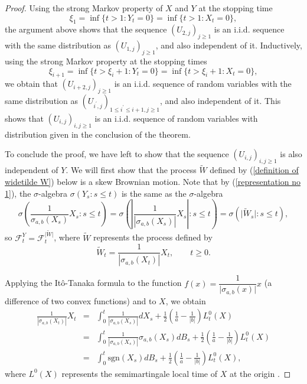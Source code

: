 \documentclass[reqno]{amsart}
\theoremstyle{definition}
\theoremstyle{remark}
\numberwithin{equation}{section}
\begin{document}
\begin{proof}
Using the strong Markov property of $X$ and $Y$ at the stopping time $$\xi_1=\inf\{t>1: Y_t=0\}=\inf\{t>1:X_t=0\},$$ the argument above shows that the sequence $(U_{2,j})_{j\geq1}$ is an i.i.d. sequence with the same distribution as $(U_{1,j})_{j\geq1}$, and also independent of it. Inductively, using the strong Markov property at the stopping times $$\xi_{i+1}=\inf\{t>\xi_i+1: Y_t=0\}=\inf\{t>\xi_i+1:X_t=0\},$$ we obtain that $(U_{i+2,j})_{j\geq1}$ is an i.i.d. sequence of random variables with the same distribution as $(U_{i^\prime,j})_{1\leq i^\prime \leq i+1, j\geq 1}$, and also independent of it. This shows that $(U_{i,j})_{i,j\geq1}$ is an i.i.d. sequence of random variables with distribution given in the conclusion of the theorem.

To conclude the proof, we have left to show that the sequence $(U_{i,j})_{i,j\ge 1}$ is also independent of $Y$. We will first show that the process $\widetilde{W}$ defined by (\ref{definition of widetilde W}) below is a skew Brownian motion. Note that by (\ref{representation no 1}), the $\sigma$-algebra $\sigma(Y_s:s\leq t)$ is the same as the $\sigma$-algebra
\begin{equation*}
\sigma\left( \frac{1}{\sigma_{a,b}(X_s)} X_{s}:s\leq t\right)=\sigma\left( \left\vert \frac{1}{\left\vert\sigma_{a,b}(X_s)\right\vert} X_{s}\right\vert:s\leq t\right)=\sigma\left(\big\vert\widetilde{W}_s \big\vert:s\leq t\right) ,
\end{equation*}
so $\mathcal{F}^Y_t = \mathcal{F}_{t}^{\vert \widetilde{W} \vert}$, where $\widetilde{W}$ represents the process defined by
\begin{equation}\label{definition of widetilde W}
\widetilde{W}_t=\frac{1}{\left\vert \sigma_{a,b}(X_{t})\right\vert }X_{t}, \qquad t\geq 0.
\end{equation}

Applying the It\^{o}-Tanaka formula to the function $f(x)=\dfrac{1}{\vert\sigma_{a,b}(x)\vert} x$ (a difference of two convex functions) and to $X$, we obtain
\begin{eqnarray*}
\frac{1}{\left\vert \sigma_{a,b}(X_{t})\right\vert }X_{t}&=&\int_0^t \frac{1}{\left\vert \sigma_{a,b}(X_{s})\right\vert } d X_{s} + \frac12\left( \frac{1}{a}-\frac{1}{\vert b\vert}\right) L_t^0(X)\\
&=&\int_0^t \frac{1}{\left\vert \sigma_{a,b}(X_{s})\right\vert } \sigma_{a,b}(X_s) d B_{s} + \frac12\left( \frac{1}{a}-\frac{1}{\vert b\vert}\right) L_t^0(X)\\
&=&\int_0^t \mathrm{sgn}(X_s) d B_{s} + \frac12\left( \frac{1}{a}-\frac{1}{\vert b\vert}\right) L_t^0(X),
\end{eqnarray*}
where $L^0(X)$ represents the semimartingale local time of $X$ at the origin .


\end{proof}
\end{document}
